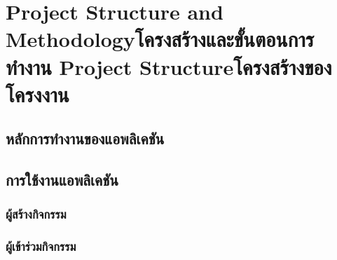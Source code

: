 \chapter{\ifproject%
\ifenglish Project Structure and Methodology\else โครงสร้างและขั้นตอนการทำงาน\fi
\else%
\ifenglish Project Structure\else โครงสร้างของโครงงาน\fi
\fi
}


\makeatletter


\makeatother

\section{หลักการทำงานของแอพลิเคชัน}


\section{การใช้งานแอพลิเคชัน}
\subsection{ผู้สร้างกิจกรรม}
\subsection{ผู้เข้าร่วมกิจกรรม}
